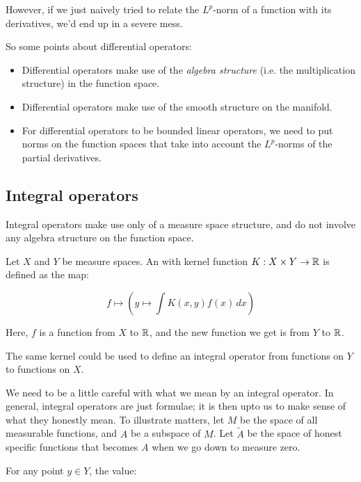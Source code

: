 \documentclass[a4paper]{amsart}
\begin{document}
However, if we just naively tried to relate the $L^p$-norm of a
function with its derivatives, we'd end up in a severe mess.

So some points about differential operators:

\begin{itemize}

\item Differential operators make use of the {\em algebra structure}
  (i.e. the multiplication structure) in the function space.

\item Differential operators make use of the smooth structure on the manifold.

\item For differential operators to be bounded linear operators, we
  need to put norms on the function spaces that take into account the
  $L^p$-norms of the partial derivatives.

\end{itemize}

\subsection{Integral operators}

Integral operators make use only of a measure space structure, and do
not involve any algebra structure on the function space.

\begin{definer}
  Let $X$ and $Y$ be measure spaces. An 
  with kernel function $K:X \times Y \to \mathbb{R}$ is defined as the map:

  $$f \mapsto (y \mapsto \int K(x,y)f(x)\, dx)$$

  Here, $f$ is a function from $X$ to $\mathbb{R}$, and the new function we
  get is from $Y$ to $\mathbb{R}$.
\end{definer}

The same kernel could be used to define an integral operator from
functions on $Y$ to functions on $X$.

We need to be a little careful with what we mean by an integral
operator. In general, integral operators are just formulae; it is then
upto us to make sense of what they honestly mean. To illustrate
matters, let $M$ be the space of all measurable functions, and $A$ be
a subspace of $M$. Let $\tilde{A}$ be the space of honest specific functions
that becomes $A$ when we go down to measure zero.

For any point $y \in Y$, the value:
\end{document}

